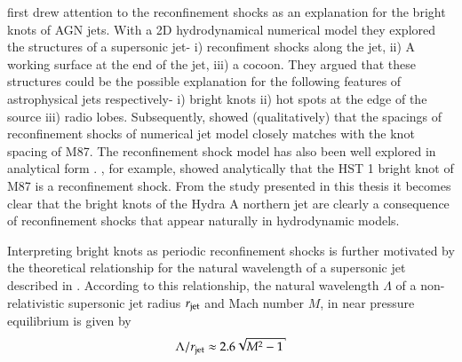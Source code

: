 \citet{norman82} first drew attention to the reconfinement shocks as an explanation for the bright knots of AGN jets. With a 2D hydrodynamical numerical model they explored the structures of a supersonic jet- i) reconfiment shocks along the jet, ii) A working surface at the end of the jet, iii) a cocoon. They argued that these structures could be the possible explanation for the following features of astrophysical jets respectively- i) bright knots ii) hot spots at the edge of the source iii) radio lobes. Subsequently, \citet{falle85} showed (qualitatively) that the spacings of reconfinement shocks of numerical jet model closely matches with the knot spacing of M87. The reconfinement shock model has also been well explored in analytical form \citep{canto89, kaiser97, komissarov97}. \citet{stawarz06}, for example, showed analytically that the HST 1 bright knot of M87 is a reconfinement shock. From the study presented in this thesis it becomes clear that the bright knots of the Hydra A northern jet are clearly a consequence of reconfinement shocks that appear naturally in hydrodynamic models. 

Interpreting bright knots as periodic reconfinement shocks is further motivated by the theoretical relationship for the natural wavelength of a supersonic jet described in \citet{birkhoff57a}. According to this relationship, the natural wavelength $\Lambda$ of a non-relativistic supersonic jet radius $r_{\rm jet}$ and Mach number $M$, in near pressure equilibrium is given by
 \begin{equation}
\Lambda/r_{\rm jet} \approx 2.6 \sqrt{M^2 - 1}
\label{e:birkhoff}
\end{equation}


